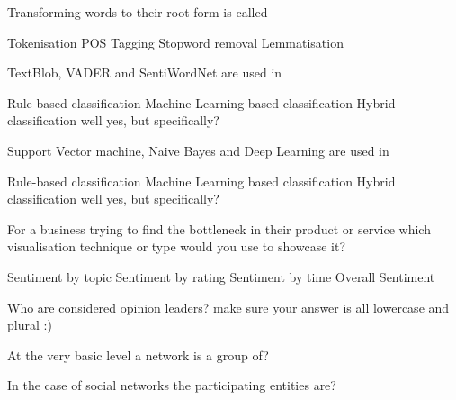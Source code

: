 \documentclass[theme=sleek, randomorder, hidesidemenu]{webquiz}
\begin{document}
\begin{question}
  Transforming words to their root form is called
  \begin{choice}
    \incorrect Tokenisation
    \incorrect POS Tagging
    \incorrect Stopword removal
    \correct Lemmatisation
  \end{choice}
\end{question}

\begin{question}
  TextBlob, VADER and SentiWordNet are used in
  \begin{choice}
    \correct Rule-based classification
    \incorrect Machine Learning based classification
    \incorrect Hybrid classification \feedback well yes, but specifically?
  \end{choice}

\end{question}

\begin{question}
  Support Vector machine, Naive Bayes and Deep Learning are used in
  \begin{choice}
    \incorrect Rule-based classification
    \correct Machine Learning based classification
    \incorrect Hybrid classification \feedback well yes, but specifically?
  \end{choice}
\end{question}

\begin{question}
  For a business trying to find the bottleneck in their product or service
  which visualisation technique or type would you use to showcase it?
  \begin{choice}
    \correct Sentiment by topic
    \incorrect Sentiment by rating
    \incorrect Sentiment by time
    \incorrect Overall Sentiment
  \end{choice}
\end{question}

\begin{question}
  Who are considered opinion leaders?
   \whenWrong make sure your answer is all lowercase and plural :)
\end{question}

\begin{question}
  At the very basic level a network is a group of?
\end{question}

\begin{question}
  In the case of social networks the participating entities are?
\end{question}
\end{document}

